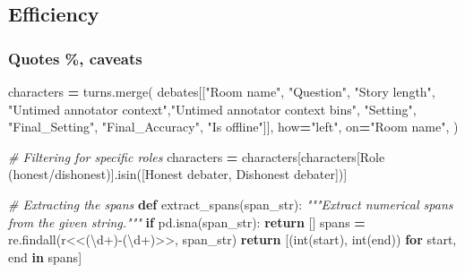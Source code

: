 \documentclass[
]{article}
\newenvironment{Shaded}{\begin{snugshade}}{\end{snugshade}}
\newcommand{\BuiltInTok}[1]{#1}
\newcommand{\CommentTok}[1]{\textcolor[rgb]{0.56,0.35,0.01}{\textit{#1}}}
\newcommand{\ControlFlowTok}[1]{\textcolor[rgb]{0.13,0.29,0.53}{\textbf{#1}}}
\newcommand{\KeywordTok}[1]{\textcolor[rgb]{0.13,0.29,0.53}{\textbf{#1}}}
\newcommand{\NormalTok}[1]{#1}
\newcommand{\OperatorTok}[1]{\textcolor[rgb]{0.81,0.36,0.00}{\textbf{#1}}}
\newcommand{\StringTok}[1]{\textcolor[rgb]{0.31,0.60,0.02}{#1}}
\newcommand{\VerbatimStringTok}[1]{\textcolor[rgb]{0.31,0.60,0.02}{#1}}
\begin{document}
\subsection{Efficiency}\label{efficiency}

\subsubsection{Quotes \%, caveats}\label{quotes-caveats}

\begin{Shaded}
\begin{Highlighting}[]
\NormalTok{characters }\OperatorTok{=}\NormalTok{ turns.merge(}
\NormalTok{        debates[[}\StringTok{"Room name"}\NormalTok{, }\StringTok{"Question"}\NormalTok{, }\StringTok{"Story length"}\NormalTok{,}
                 \StringTok{"Untimed annotator context"}\NormalTok{,}\StringTok{"Untimed annotator context bins"}\NormalTok{,}
                 \StringTok{"Setting"}\NormalTok{, }\StringTok{"Final\_Setting"}\NormalTok{, }\StringTok{"Final\_Accuracy"}\NormalTok{,}
                 \StringTok{"Is offline"}\NormalTok{]],}
\NormalTok{        how}\OperatorTok{=}\StringTok{"left"}\NormalTok{,}
\NormalTok{        on}\OperatorTok{=}\StringTok{"Room name"}\NormalTok{,}
\NormalTok{    )}



\CommentTok{\# Filtering for specific roles}
\NormalTok{characters }\OperatorTok{=}\NormalTok{ characters[characters[}\StringTok{\textquotesingle{}Role (honest/dishonest)\textquotesingle{}}\NormalTok{].isin([}\StringTok{\textquotesingle{}Honest debater\textquotesingle{}}\NormalTok{, }\StringTok{\textquotesingle{}Dishonest debater\textquotesingle{}}\NormalTok{])]}

\CommentTok{\# Extracting the spans}
\KeywordTok{def}\NormalTok{ extract\_spans(span\_str):}
    \CommentTok{"""Extract numerical spans from the given string."""}
    \ControlFlowTok{if}\NormalTok{ pd.isna(span\_str):}
        \ControlFlowTok{return}\NormalTok{ []}
\NormalTok{    spans }\OperatorTok{=}\NormalTok{ re.findall(}\VerbatimStringTok{r\textquotesingle{}\textless{}\textless{}(\textbackslash{}d+){-}(\textbackslash{}d+)\textgreater{}\textgreater{}\textquotesingle{}}\NormalTok{, span\_str)}
    \ControlFlowTok{return}\NormalTok{ [(}\BuiltInTok{int}\NormalTok{(start), }\BuiltInTok{int}\NormalTok{(end)) }\ControlFlowTok{for}\NormalTok{ start, end }\KeywordTok{in}\NormalTok{ spans]}


\end{Highlighting}
\end{Shaded}
\end{document}
